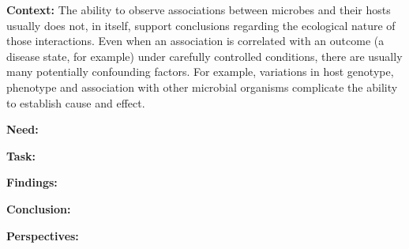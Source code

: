 
\noindent\textbf{Context:}
The ability to observe associations between microbes and their hosts usually does not, in itself, support conclusions regarding the ecological nature of those interactions. Even when an association is correlated with an outcome (a disease state, for example) under carefully controlled conditions, there are usually many potentially confounding factors. For example, variations in host genotype, phenotype and association with other microbial organisms complicate the ability to establish cause and effect.

\noindent\textbf{Need:} 

\noindent\textbf{Task:} 

\noindent\textbf{Findings:} 

\noindent\textbf{Conclusion:}

\noindent\textbf{Perspectives:}
